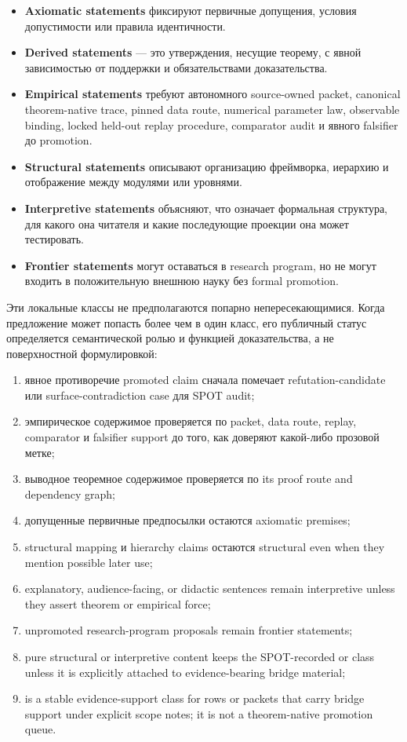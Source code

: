 \begin{itemize}
\item \textbf{Axiomatic statements} фиксируют первичные допущения, условия
      допустимости или правила идентичности.
\item \textbf{Derived statements} — это утверждения, несущие теорему, с явной
      зависимостью от поддержки и обязательствами доказательства.
\item \textbf{Empirical statements} требуют автономного source-owned packet,
      canonical theorem-native trace, pinned data route, numerical parameter
      law, observable binding, locked held-out replay procedure, comparator
      audit и явного falsifier до promotion.
\item \textbf{Structural statements} описывают организацию фреймворка,
      иерархию и отображение между модулями или уровнями.
\item \textbf{Interpretive statements} объясняют, что означает формальная
      структура, для какого она читателя и какие последующие проекции она
      может тестировать.
\item \textbf{Frontier statements} могут оставаться в research program, но не
      могут входить в положительную внешнюю науку без formal promotion.
\end{itemize}
Эти локальные классы не предполагаются попарно непересекающимися. Когда
предложение может попасть более чем в один класс, его публичный статус
определяется семантической ролью и функцией доказательства, а не поверхностной
формулировкой:
\begin{enumerate}
\item явное противоречие promoted claim сначала помечает refutation-candidate
      или surface-contradiction case для SPOT audit;
\item эмпирическое содержимое проверяется по packet, data route, replay,
      comparator и falsifier support до того, как доверяют какой-либо
      прозовой метке;
\item выводное теоремное содержимое проверяется по its proof route and
      dependency graph;
\item допущенные первичные предпосылки остаются axiomatic premises;
\item structural mapping и hierarchy claims остаются structural even when
      they mention possible later use;
\item explanatory, audience-facing, or didactic sentences remain interpretive
      unless they assert theorem or empirical force;
\item unpromoted research-program proposals remain frontier statements;
\item pure structural or interpretive content keeps the SPOT-recorded
       or  class unless it is explicitly
      attached to evidence-bearing bridge material;
\item {} is a stable evidence-support class for rows or
      packets that carry bridge support under explicit scope notes; it is not a
      theorem-native promotion queue.
\end{enumerate}
